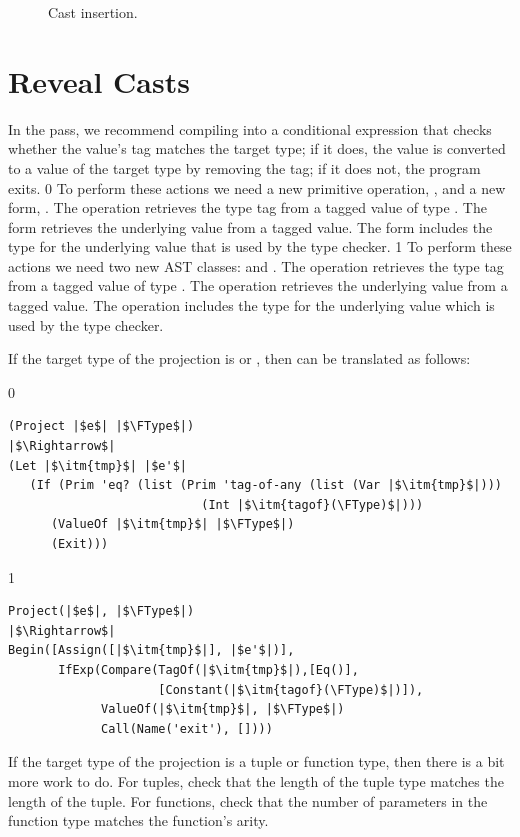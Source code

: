 \documentclass[7x10]{TimesAPriori_MIT}%
\def\racketEd{0}
\def\pythonEd{1}
\def\edition{1}
\newcommand{\pythonColor}[0]{}
\numberwithin{theorem}{chapter}
\numberwithin{definition}{chapter}
\numberwithin{equation}{chapter}
\begin{document}
\begin{figure}[btp]
  \caption{Cast insertion.}
\label{fig:compile-r7-Lany}
\end{figure}



\section{Reveal Casts}
\label{sec:reveal-casts-Lany}


In the  pass, we recommend compiling
 into a conditional expression that checks whether the
value's tag matches the target type; if it does, the value is
converted to a value of the target type by removing the tag; if it
does not, the program exits.
%
{\if\edition\racketEd
%
To perform these actions we need a new primitive operation,
, and a new form, .
The  operation retrieves the type tag from a tagged
value of type .  The  form retrieves the
underlying value from a tagged value.  The  form
includes the type for the underlying value that is used by the type
checker.
%
\fi}
%
{\if\edition\pythonEd\pythonColor
%
To perform these actions we need two new AST classes:  and
. The  operation retrieves the type tag from a
tagged value of type \ANYTY{}.  The  operation retrieves
the underlying value from a tagged value.  The 
operation includes the type for the underlying value which is used by
the type checker.
%
\fi}

If the target type of the projection is \BOOLTY{} or \INTTY{}, then
 can be translated as follows:
\begin{center}
\begin{minipage}{1.0\textwidth}
{\if\edition\racketEd    
\begin{lstlisting}
(Project |$e$| |$\FType$|)
|$\Rightarrow$|
(Let |$\itm{tmp}$| |$e'$|
   (If (Prim 'eq? (list (Prim 'tag-of-any (list (Var |$\itm{tmp}$|)))
                           (Int |$\itm{tagof}(\FType)$|)))
      (ValueOf |$\itm{tmp}$| |$\FType$|)
      (Exit)))
\end{lstlisting}
\fi}
{\if\edition\pythonEd\pythonColor
\begin{lstlisting}
Project(|$e$|, |$\FType$|)
|$\Rightarrow$|
Begin([Assign([|$\itm{tmp}$|], |$e'$|)],
       IfExp(Compare(TagOf(|$\itm{tmp}$|),[Eq()],
                     [Constant(|$\itm{tagof}(\FType)$|)]),
             ValueOf(|$\itm{tmp}$|, |$\FType$|)
             Call(Name('exit'), [])))
\end{lstlisting}
\fi}
\end{minipage}
\end{center}
If the target type of the projection is a tuple or function type, then
there is a bit more work to do. For tuples, check that the length of
the tuple type matches the length of the tuple. For functions, check
that the number of parameters in the function type matches the
function's arity.
\end{document}
